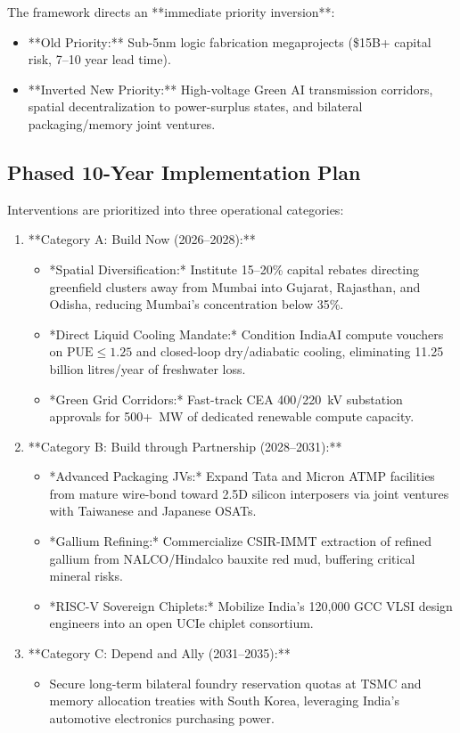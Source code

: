\documentclass[conference]{IEEEtran}
\begin{document}
The framework directs an **immediate priority inversion**:
\begin{itemize}
\item **Old Priority:** Sub-5nm logic fabrication megaprojects (\$15B+ capital risk, 7--10 year lead time).
\item **Inverted New Priority:** High-voltage Green AI transmission corridors, spatial decentralization to power-surplus states, and bilateral packaging/memory joint ventures.
\end{itemize}

\subsection{Phased 10-Year Implementation Plan}
Interventions are prioritized into three operational categories:
\begin{enumerate}
\item **Category A: Build Now (2026--2028):**
  \begin{itemize}
  \item *Spatial Diversification:* Institute 15--20\% capital rebates directing greenfield clusters away from Mumbai into Gujarat, Rajasthan, and Odisha, reducing Mumbai's concentration below 35\%.
  \item *Direct Liquid Cooling Mandate:* Condition IndiaAI compute vouchers on $\text{PUE} \le 1.25$ and closed-loop dry/adiabatic cooling, eliminating 11.25 billion litres/year of freshwater loss.
  \item *Green Grid Corridors:* Fast-track CEA 400/220~kV substation approvals for 500+~MW of dedicated renewable compute capacity.
  \end{itemize}
\item **Category B: Build through Partnership (2028--2031):**
  \begin{itemize}
  \item *Advanced Packaging JVs:* Expand Tata and Micron ATMP facilities from mature wire-bond toward 2.5D silicon interposers via joint ventures with Taiwanese and Japanese OSATs.
  \item *Gallium Refining:* Commercialize CSIR-IMMT extraction of refined gallium from NALCO/Hindalco bauxite red mud, buffering critical mineral risks.
  \item *RISC-V Sovereign Chiplets:* Mobilize India's 120,000 GCC VLSI design engineers into an open UCIe chiplet consortium.
  \end{itemize}
\item **Category C: Depend and Ally (2031--2035):**
  \begin{itemize}
  \item Secure long-term bilateral foundry reservation quotas at TSMC and memory allocation treaties with South Korea, leveraging India's automotive electronics purchasing power.
  \end{itemize}
\end{enumerate}
\end{document}
